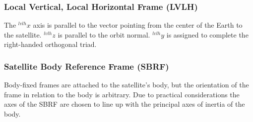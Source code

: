 \subsubsection{Local Vertical, Local Horizontal Frame (LVLH)}

The $^{lvlh}x$ axis is parallel to the vector  pointing from the center of the Earth to the satellite. $^{lvlh}z$ is parallel to the orbit normal. $^{lvlh}y$ is assigned to complete the right-handed orthogonal triad.

\subsubsection{Satellite Body Reference Frame (SBRF)}

Body-fixed frames are attached to the satellite's body, but the orientation of the frame in relation to the body is arbitrary. Due to practical considerations the axes of the SBRF are chosen to line up with the principal axes of inertia of the body.
